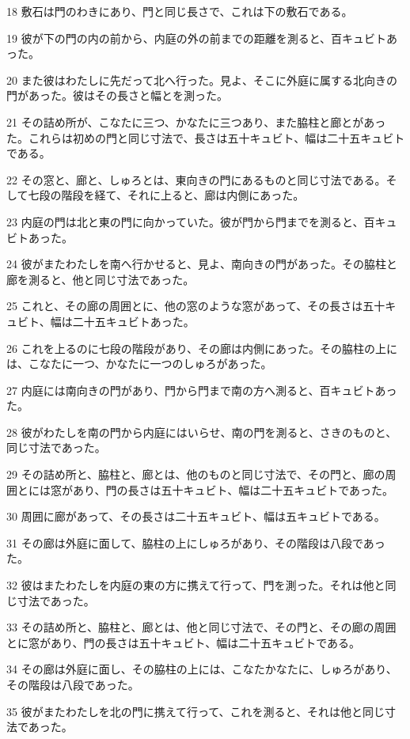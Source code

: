 \par 18 敷石は門のわきにあり、門と同じ長さで、これは下の敷石である。
\par 19 彼が下の門の内の前から、内庭の外の前までの距離を測ると、百キュビトあった。
\par 20 また彼はわたしに先だって北へ行った。見よ、そこに外庭に属する北向きの門があった。彼はその長さと幅とを測った。
\par 21 その詰め所が、こなたに三つ、かなたに三つあり、また脇柱と廊とがあった。これらは初めの門と同じ寸法で、長さは五十キュビト、幅は二十五キュビトである。
\par 22 その窓と、廊と、しゅろとは、東向きの門にあるものと同じ寸法である。そして七段の階段を経て、それに上ると、廊は内側にあった。
\par 23 内庭の門は北と東の門に向かっていた。彼が門から門までを測ると、百キュビトあった。
\par 24 彼がまたわたしを南へ行かせると、見よ、南向きの門があった。その脇柱と廊を測ると、他と同じ寸法であった。
\par 25 これと、その廊の周囲とに、他の窓のような窓があって、その長さは五十キュビト、幅は二十五キュビトあった。
\par 26 これを上るのに七段の階段があり、その廊は内側にあった。その脇柱の上には、こなたに一つ、かなたに一つのしゅろがあった。
\par 27 内庭には南向きの門があり、門から門まで南の方へ測ると、百キュビトあった。
\par 28 彼がわたしを南の門から内庭にはいらせ、南の門を測ると、さきのものと、同じ寸法であった。
\par 29 その詰め所と、脇柱と、廊とは、他のものと同じ寸法で、その門と、廊の周囲とには窓があり、門の長さは五十キュビト、幅は二十五キュビトであった。
\par 30 周囲に廊があって、その長さは二十五キュビト、幅は五キュビトである。
\par 31 その廊は外庭に面して、脇柱の上にしゅろがあり、その階段は八段であった。
\par 32 彼はまたわたしを内庭の東の方に携えて行って、門を測った。それは他と同じ寸法であった。
\par 33 その詰め所と、脇柱と、廊とは、他と同じ寸法で、その門と、その廊の周囲とに窓があり、門の長さは五十キュビト、幅は二十五キュビトである。
\par 34 その廊は外庭に面し、その脇柱の上には、こなたかなたに、しゅろがあり、その階段は八段であった。
\par 35 彼がまたわたしを北の門に携えて行って、これを測ると、それは他と同じ寸法であった。
